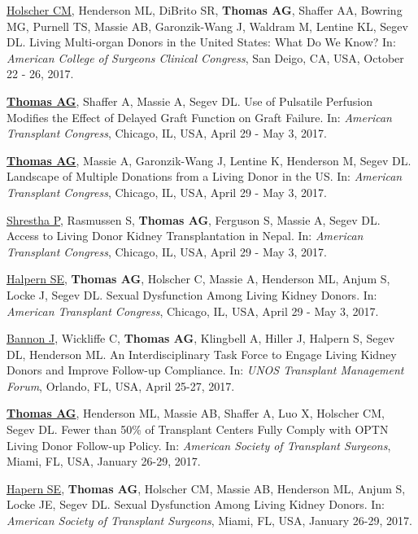 \documentclass[10pt]{article}
\makeatletter
\newlength{\bibhang}
\newlength{\bibsep}
 {\@listi \global\bibsep\itemsep \global\advance\bibsep by\parsep}
\newenvironment{bibenum*}
  {\renewcommand\labelenumi{[\theenumi]}%
   \etaremune[
     topsep=0pt,
     itemsep=\bibsep,
     parsep=0pt,partopsep=0pt,
     itemindent=-\bibhang,
     leftmargin={\bibhang+\widthof{[999]}}]}
  {\endetaremune}
\makeatother
\begin{document}
\begin{bibenum*}
\item \underline{Holscher CM}, Henderson ML, DiBrito SR, \textbf{Thomas AG},
  Shaffer AA, Bowring MG, Purnell TS, Massie AB, Garonzik-Wang J,
  Waldram M, Lentine KL, Segev DL. Living Multi-organ Donors in the
  United States: What Do We Know?
  In: \emph{American College of Surgeons Clinical Congress},
  San Deigo, CA, USA, October 22 - 26, 2017.

\item \underline{\textbf{Thomas AG}}, Shaffer A, Massie A, Segev DL.
  Use of Pulsatile Perfusion Modifies the Effect of
  Delayed Graft Function on Graft Failure.
  In: \emph{American Transplant Congress},
  Chicago, IL, USA, April 29 - May 3, 2017.

\item \underline{\textbf{Thomas AG}}, Massie A, Garonzik-Wang J,
  Lentine K, Henderson M, Segev DL.
  Landscape of Multiple Donations from a Living Donor in the US.
  In: \emph{American Transplant Congress},
  Chicago, IL, USA, April 29 - May 3, 2017.

\item \underline{Shrestha P}, Rasmussen S, \textbf{Thomas AG},
  Ferguson S, Massie A, Segev DL.
  Access to Living Donor Kidney Transplantation in Nepal.
  In: \emph{American Transplant Congress},
  Chicago, IL, USA, April 29 - May 3, 2017.

\item \underline{Halpern SE}, \textbf{Thomas AG}, Holscher C, Massie A,
  Henderson ML, Anjum S, Locke J, Segev DL.
  Sexual Dysfunction Among Living Kidney Donors.
  In: \emph{American Transplant Congress},
  Chicago, IL, USA, April 29 - May 3, 2017.

\item \underline{Bannon J}, Wickliffe C, \textbf{Thomas AG}, Klingbell A,
  Hiller J, Halpern S, Segev DL, Henderson ML.
  An Interdisciplinary Task Force to Engage Living Kidney
  Donors and Improve Follow-up Compliance.
  In: \emph{UNOS Transplant Management Forum},
  Orlando, FL, USA, April 25-27, 2017.

\item \underline{\textbf{Thomas AG}}, Henderson ML, Massie AB, Shaffer A,
  Luo X, Holscher CM, Segev DL. Fewer than 50\% of Transplant Centers Fully
  Comply with OPTN Living Donor Follow-up Policy.
  In: \emph{American Society of Transplant Surgeons},
  Miami, FL, USA, January 26-29, 2017.

\item \underline{Hapern SE}, \textbf{Thomas AG}, Holscher CM, Massie AB,
  Henderson ML, Anjum S, Locke JE, Segev DL.
  Sexual Dysfunction Among Living Kidney Donors.
  In: \emph{American Society of Transplant Surgeons},
  Miami, FL, USA, January 26-29, 2017.


\end{bibenum*}
\end{document}
